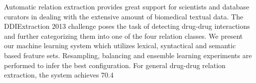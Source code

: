 Automatic relation extraction provides great support for scientists and database curators in dealing with the extensive amount of biomedical textual
 data. The DDIExtraction 2013 challenge poses the task of detecting drug-drug
 interactions and further categorizing them into one of the four relation
 classes. We
 present our machine learning system which utilizes lexical, syntactical and
 semantic based feature sets. Resampling, balancing and ensemble learning
 experiments are performed to infer the best configuration. For general
 drug-drug relation extraction, the system achieves 70.4\\%

